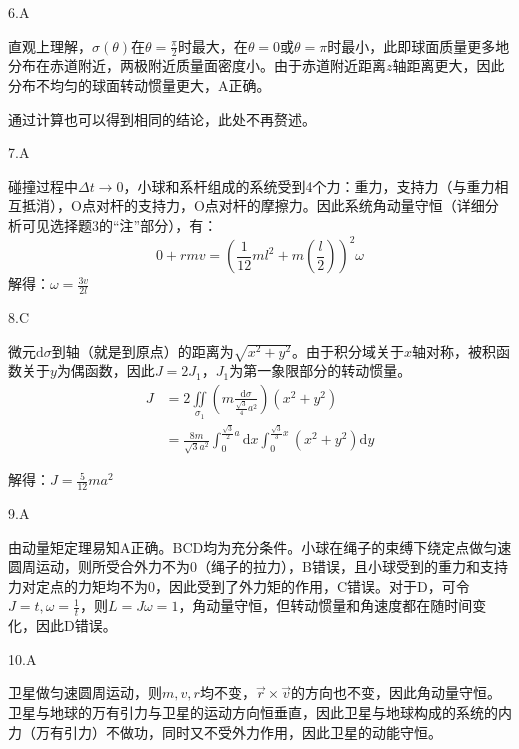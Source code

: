 \documentclass[blue, normal]{./templete/qyxfnote}
\newcommand{\di}[1]{\mathrm{d}#1}
\newcommand{\zbj}[4]
{
	\draw (0,0) node[below left] {$ O $};
	\draw [->] (#1,0) -- (#2,0) node[right] {$ x $};
	\draw [->] (0,#3) -- (0,#4) node[right] {$ y $};
}
\begin{document}
\begin{multicols}{2}
			6.A
			
			直观上理解，$ \sigma(\theta) $在$ \theta=\frac{\pi}{2} $时最大，在$ \theta=0 $或$ \theta=\pi $时最小，此即球面质量更多地分布在赤道附近，两极附近质量面密度小。由于赤道附近距离$ z $轴距离更大，因此分布不均匀的球面转动惯量更大，A正确。\par
			通过计算也可以得到相同的结论，此处不再赘述。
			
			7.A
			
			碰撞过程中$ \Delta t\to 0 $，小球和系杆组成的系统受到4个力：重力，支持力（与重力相互抵消），O点对杆的支持力，O点对杆的摩擦力。因此系统角动量守恒（详细分析可见选择题3的“注”部分），有：
			\[0+rmv=(\frac{1}{12}ml^2+m\left(\frac{l}{2}\right))^2\omega\]
			解得：$\omega=\frac{3v}{2l}$
		
			8.C
			
			\par
			微元$ \di{\sigma} $到轴（就是到原点）的距离为$ \sqrt{x^2+y^2} $。由于积分域关于$ x $轴对称，被积函数关于$ y $为偶函数，因此$ J=2J_1 $，$ J_1 $为第一象限部分的转动惯量。
			\begin{align*}
			J&=2\iint\limits_{\sigma_1}\left(m\frac{\di{\sigma}}{\frac{\sqrt{3}}{4}a^2}\right)(x^2+y^2)\\
			&=\frac{8m}{\sqrt{3}a^2}\int_0^{\frac{\sqrt{3}}{2}a}\di{x}\int_0^{\frac{\sqrt{3}}{3}x}(x^2+y^2)\di{y}
			\end{align*}\par
			解得：$ J=\frac{5}{12}ma^2 $
			
			9.A
			
			由动量矩定理易知A正确。BCD均为充分条件。小球在绳子的束缚下绕定点做匀速圆周运动，则所受合外力不为0（绳子的拉力），B错误，且小球受到的重力和支持力对定点的力矩均不为0，因此受到了外力矩的作用，C错误。对于D，可令$ J=t,\omega=\frac{1}{t} $，则$ L=J\omega=1 $，角动量守恒，但转动惯量和角速度都在随时间变化，因此D错误。
			
			10.A
			
			卫星做匀速圆周运动，则$ m,v,r $均不变，$ \vec{r}\times\vec{v} $的方向也不变，因此角动量守恒。卫星与地球的万有引力与卫星的运动方向恒垂直，因此卫星与地球构成的系统的内力（万有引力）不做功，同时又不受外力作用，因此卫星的动能守恒。

\end{multicols}
\end{document}
